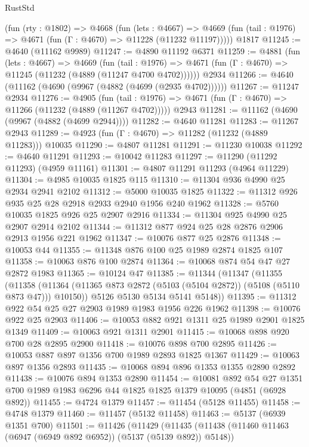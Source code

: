 \begin{lexlean}{RustStd}
\begin{coremodule}
    (fun (rty : @1802) =>
    @4668
      (fun (lets : @4667) =>
      @4669 (fun (tail : @1976) => @4671 (fun (Γ : @4670) => @11228 (@11232 @11197)))))
    @1817
@11245 := @4640 (@11162 @9989)
@11247 := @4890 @11192 @6371
@11259 := @4881
    (fun (lets : @4667) =>
    @4669
      (fun (tail : @1976) =>
      @4671 (fun (Γ : @4670) => @11245 (@11232 (@4889 (@11247 @4700 @4702))))))
    @2934
@11266 := @4640 (@11162 (@4690 (@9967 (@4882 (@4699 (@2935 @4702))))))
@11267 := @11247 @2934
@11276 := @4905
    (fun (tail : @1976) => @4671 (fun (Γ : @4670) => @11266 (@11232 (@4889 (@11267 @4702)))))
    @2943
@11281 := @11162 (@4690 (@9967 (@4882 (@4699 @2944))))
@11282 := @4640 @11281
@11283 := @11267 @2943
@11289 := @4923 (fun (Γ : @4670) => @11282 (@11232 (@4889 @11283))) @10035
@11290 := @4807 @11281
@11291 := @11230 @10038
@11292 := @4640 @11291
@11293 := @10042 @11283
@11297 := @11290 (@11292 @11293) (@4959 @11161)
@11301 := @4807 @11291 @11293 (@4964 @11229)
@11304 := @4985 @10035 @1825 @115
@11310 := @11304 @936 @4990 @25 @2934 @2941 @2102
@11312 := @5000 @10035 @1825
@11322 := @11312 @926 @935 @25 @28 @2918 @2933 @2940 @1956 @240 @1962
@11328 := @5760 @10035 @1825 @926 @25 @2907 @2916
@11334 := @11304 @925 @4990 @25 @2907 @2914 @2102
@11344 := @11312 @877 @924 @25 @28 @2876 @2906 @2913 @1956 @221 @1962
@11347 := @10076 @877 @25 @2876
@11348 := @10053 @44
@11355 := @11348 @876 @100 @25 @1989 @2874 @1825 @107
@11358 := @10063 @876 @100 @2874
@11364 := @10068 @874 @54 @47 @27 @2872 @1983
@11365 := @10124 @47
@11385 := @11344
    (@11347
      (@11355
        (@11358 (@11364 (@11365 @873 @2872 (@5103 (@5104 @2872)) (@5108 (@5110 @873 @47))) @10150))
        @5126
        @5130
        @5134
        @5141
        @5148))
@11395 := @11312 @922 @54 @25 @27 @2903 @1989 @1983 @1956 @226 @1962
@11398 := @10076 @922 @25 @2903
@11406 := @10053 @882 @921 @1311 @25 @1989 @2901 @1825 @1349
@11409 := @10063 @921 @1311 @2901
@11415 := @10068 @898 @920 @700 @28 @2895 @2900
@11418 := @10076 @898 @700 @2895
@11426 := @10053 @887 @897 @1356 @700 @1989 @2893 @1825 @1367
@11429 := @10063 @897 @1356 @2893
@11435 := @10068 @894 @896 @1353 @1355 @2890 @2892
@11438 := @10076 @894 @1353 @2890
@11454 := @10081
    @892
    @54
    @27
    @1351
    @700
    @1989
    @1983
    @6296
    @44
    @1825
    @1825
    @1379
    @10095
    (@4851 (@6928 @892))
@11455 := @4724 @1379
@11457 := @11454 (@5128 @11455)
@11458 := @4748 @1379
@11460 := @11457 (@5132 @11458)
@11463 := @5137 (@6939 @1351 @700)
@11501 := @11426
    (@11429
      (@11435
        (@11438 (@11460 @11463 (@6947 (@6949 @892 @6952)) (@5137 (@5139 @892)) @5148))

\end{coremodule}
\end{lexlean}
